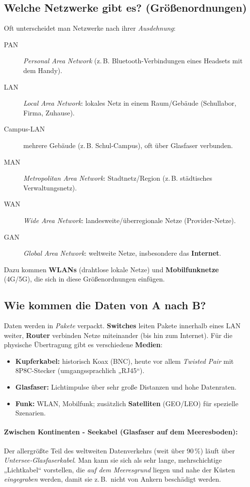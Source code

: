 \documentclass[../skript/main.tex]{subfiles}
\begin{document}
	\subsection*{Welche Netzwerke gibt es? (Größenordnungen)}
	Oft unterscheidet man Netzwerke nach ihrer \emph{Ausdehnung}:
	\begin{description}
		\item[PAN] \emph{Personal Area Network} (z.\,B. Bluetooth-Verbindungen eines Headsets mit dem Handy).
		\item[LAN] \emph{Local Area Network}: lokales Netz in einem Raum/Gebäude (Schullabor, Firma, Zuhause).
		\item[Campus-LAN] mehrere Gebäude (z.\,B. Schul-Campus), oft über Glasfaser verbunden.
		\item[MAN] \emph{Metropolitan Area Network}: Stadtnetz/Region (z.\,B. städtisches Verwaltungsnetz).
		\item[WAN] \emph{Wide Area Network}: landesweite/überregionale Netze (Provider-Netze).
		\item[GAN] \emph{Global Area Network}: weltweite Netze, insbesondere das \textbf{Internet}.
	\end{description}
	Dazu kommen \textbf{WLANs} (drahtlose lokale Netze) und \textbf{Mobilfunknetze} (4G/5G), die sich in diese
	Größenordnungen einfügen.
	
	\subsection*{Wie kommen die Daten von A nach B?}
	Daten werden in \emph{Pakete} verpackt. \textbf{Switches} leiten Pakete innerhalb eines LAN weiter,
	\textbf{Router} verbinden Netze miteinander (bis hin zum Internet). Für die physische Übertragung
	gibt es verschiedene \textbf{Medien}:
	\begin{itemize}
		\item \textbf{Kupferkabel:} historisch Koax (BNC), heute vor allem \emph{Twisted Pair} mit 8P8C-Stecker
		(umgangssprachlich „RJ45“).
		\item \textbf{Glasfaser:} Lichtimpulse über sehr große Distanzen und hohe Datenraten.
		\item \textbf{Funk:} WLAN, Mobilfunk; zusätzlich \textbf{Satelliten} (GEO/LEO) für spezielle Szenarien.
	\end{itemize}
	
	\paragraph{Zwischen Kontinenten - Seekabel (Glasfaser auf dem Meeresboden):}
	Der allergrößte Teil des weltweiten Datenverkehrs (weit über 90\,\%) läuft über \emph{Untersee-Glasfaserkabel}. Man kann sie sich als sehr lange, mehrschichtige „Lichtkabel“ vorstellen, die \emph{auf dem Meeresgrund} liegen und nahe der Küsten \emph{eingegraben} werden, damit sie z.\,B.\ nicht von Ankern beschädigt werden.
	
\end{document}
